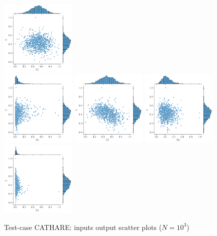 \begin{figure}
  \includegraphics[width=0.32\textwidth]{./part2/figures/SIS/cathare_jointplot_X5.pdf}\\
  \includegraphics[width=0.32\textwidth]{./part2/figures/SIS/cathare_jointplot_X6.pdf}
  \includegraphics[width=0.32\textwidth]{./part2/figures/SIS/cathare_jointplot_X7.pdf}
  \includegraphics[width=0.32\textwidth]{./part2/figures/SIS/cathare_jointplot_X8.pdf}\\
  \includegraphics[width=0.32\textwidth]{./part2/figures/SIS/cathare_jointplot_X9.pdf}
  \caption{Test-case CATHARE: inputs output scatter plots ($N=10^3$) }
  \label{fig:cathare_paiplot}
\end{figure}
